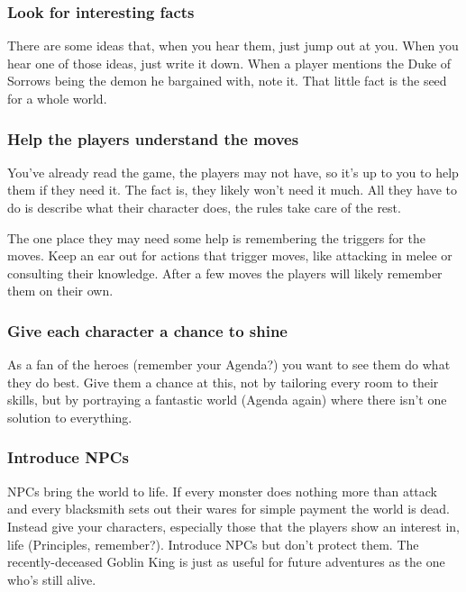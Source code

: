        
\subsubsection{Look for interesting facts}   
       

There are some ideas that, when you hear them, just jump out at you. When you hear one of those ideas, just write it down. When a player mentions the Duke of Sorrows being the demon he bargained with, note it. That little fact is the seed for a whole world.

       
\subsubsection{Help the players understand the moves}     
       

You've already read the game, the players may not have, so it's up to you to help them if they need it. The fact is, they likely won't need it much. All they have to do is describe what their character does, the rules take care of the rest.

       

The one place they may need some help is remembering the triggers for the moves. Keep an ear out for actions that trigger moves, like attacking in melee or consulting their knowledge. After a few moves the players will likely remember them on their own.

       
\subsubsection{Give each character a chance to shine}      
       

As a fan of the heroes (remember your Agenda?) you want to see them do what they do best. Give them a chance at this, not by tailoring every room to their skills, but by portraying a fantastic world (Agenda again) where there isn't one solution to everything.

       
\subsubsection{Introduce NPCs}    
       

NPCs bring the world to life. If every monster does nothing more than attack and every blacksmith sets out their wares for simple payment the world is dead. Instead give your characters, especially those that the players show an interest in, life (Principles, remember?). Introduce NPCs but don't protect them. The recently-deceased Goblin King is just as useful for future adventures as the one who's still alive.

                
